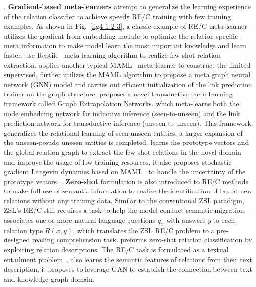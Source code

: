 \uppercase\expandafter{}. \textbf{Gradient-based meta-learners} attempt to generalize the learning experience of the relation classifier to achieve speedy RE/C training with few training examples. As shown in Fig.~\ref{fig4-1-2-3}, a classic example of RE/C meta-learner~ utilizes the gradient from embedding module to optimize the relation-specific meta information to make model learn the most important knowledge and learn faster.  use Reptile~ meta learning algorithm to realize few-shot relation extraction.  applies another typical MAML~ meta-learner to construct the limited supervised,  further utilizes the MAML algorithm to propose a meta graph neural network (GNN) model and carries out efficient initialization of the link prediction trainer on the graph structure.  proposes a novel transductive meta-learning framework called Graph Extrapolation Networks. which meta-learns both the node embedding network for inductive inference (seen-to-unseen) and the link prediction network for transductive inference (unseen-to-unseen). This framework generalizes the relational learning of seen-unseen entities, a larger expansion of the unseen-pseudo unseen entities is completed.  learns the prototype vectors and the global relation graph to extract the few-shot relations in the novel domain and improve the usage of low training resources, it also proposes stochastic gradient Langevin dynamics based on MAML~ to handle the uncertainty of the prototype vectors.
\uppercase\expandafter{}. \textbf{Zero-shot} formulation is also introduced to RE/C methods to make full use of semantic information to realize the identification of brand new relations without any training data. Similar to the conventional ZSL paradigm, ZSL's RE/C still requires a task to help the model conduct semantic migration.  associates one or more natural-language questions $q_{x}$ with answers $y$ to each relation type $R(x, y)$, which translates the ZSL RE/C problem to a pre-designed reading comprehension task.  preforms zero-shot relation classification by exploiting relation descriptions. The RE/C task is formulated as a textual entailment problem~.  also learns the semantic features of relations from their text description, it proposes to leverage GAN to establish the connection between text and knowledge graph domain.
